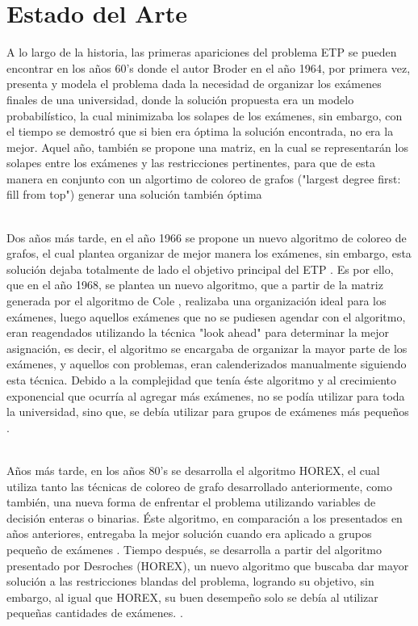 \documentclass[letter, 10pt]{article}
\begin{document}
\section{Estado del Arte}
\label{Estado}
A lo largo de la historia, las primeras apariciones del problema ETP se pueden encontrar en los años 60's donde el autor Broder \cite{Cita7} en el año 1964, por primera vez, presenta y modela el problema dada la necesidad de organizar los exámenes finales de una universidad, donde la solución propuesta era un modelo probabilístico, la cual minimizaba los solapes de los exámenes, sin embargo, con el tiempo se demostró que si bien era óptima la solución encontrada, no era la mejor. Aquel año, también se propone una matriz, en la cual se representarán los solapes entre los exámenes y las restricciones pertinentes, para que de esta manera en conjunto con un algortimo de coloreo de grafos ("largest degree first: fill from top") generar una solución también óptima \cite{Cita8}
\begin{itemize}
\end{itemize}
\\
Dos años más tarde, en el año 1966 se propone un nuevo algoritmo de coloreo de grafos, el cual plantea organizar de mejor manera los exámenes, sin embargo, esta solución dejaba totalmente de lado el objetivo principal del ETP \cite{Cita9}. Es por ello, que en el año 1968, se plantea un nuevo algoritmo, que a partir de la matriz generada por el algoritmo de Cole \cite{Cita8}, realizaba una organización ideal para los exámenes, luego aquellos exámenes que no se pudiesen agendar con el algoritmo, eran reagendados utilizando la técnica "look ahead" para determinar la mejor asignación, es decir, el algoritmo se encargaba de organizar la mayor parte de los exámenes, y aquellos con problemas, eran calenderizados manualmente siguiendo esta técnica. Debido a la complejidad que tenía éste algoritmo y al crecimiento exponencial que ocurría al agregar más exámenes, no se podía utilizar para toda la universidad, sino que, se debía utilizar para grupos de exámenes más pequeños \cite{Cita10}.
\begin{itemize}
\end{itemize}
\\
Años más tarde, en los años 80's se desarrolla el algoritmo HOREX, el cual utiliza tanto las técnicas de coloreo de grafo desarrollado anteriormente, como también, una nueva forma de enfrentar el problema utilizando variables de decisión enteras o binarias. Éste algoritmo, en comparación a los presentados en años anteriores, entregaba la mejor solución cuando era aplicado a grupos pequeño de exámenes \cite{Cita11}. Tiempo después, se desarrolla a partir del algoritmo presentado por Desroches (HOREX), un nuevo algoritmo que buscaba dar mayor solución a las restricciones blandas del problema, logrando su objetivo, sin embargo, al igual que HOREX, su buen desempeño solo se debía al utilizar pequeñas cantidades de exámenes. \cite{Cita12}.
\end{document}
